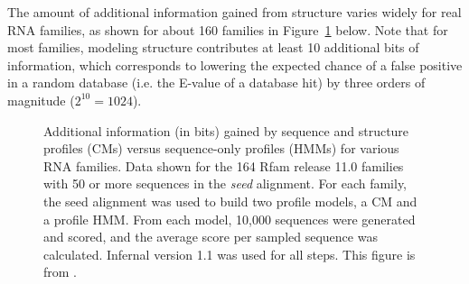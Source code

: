 \documentclass[custom,landscape,final,30pt,plainboxedsections]{sciposter-titleskipsmall}
\begin{document}
\begin{multicols}{3}
The amount of additional information gained from structure varies
widely for real RNA families, as shown for about 160 families in
Figure~\ref{fig:avgscores} below. 
Note that for most families, modeling structure
contributes at least 10 additional bits of information, which
corresponds to lowering the expected chance of a false positive in a
random database (i.e. the E-value of a database hit) by three orders
of magnitude ($2^{10} = 1024$).

\begin{footnotesize}
\begin{figure}
\caption{Additional information (in bits) gained by sequence and
  structure profiles (CMs) versus sequence-only profiles (HMMs) for
  various RNA families.  
  Data shown for the 164 Rfam release 11.0 families
  with 50 or more sequences in the \emph{seed} alignment. For each
  family, the seed alignment was used to build two profile models, a
  CM and a profile HMM. From each model, 10,000 sequences were
  generated and scored, and the average score per sampled sequence was
  calculated. Infernal version 1.1 was used for all steps. This figure
  is from \cite{Nawrocki13b}.
}
\label{fig:avgscores}
\end{figure}
\end{footnotesize}


\end{multicols}
\end{document}
